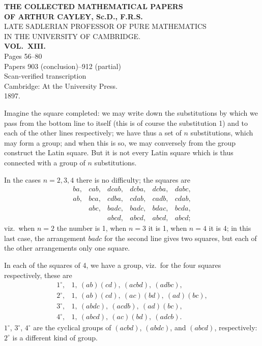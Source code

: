 \documentclass[11pt,a4paper]{article}
\begin{document}
\thispagestyle{empty}
\begin{center}
\vspace*{2cm}
{\LARGE\bfseries THE COLLECTED MATHEMATICAL PAPERS\\[0.5em] OF ARTHUR CAYLEY, Sc.D., F.R.S.\\[1em]}
{\Large LATE SADLERIAN PROFESSOR OF PURE MATHEMATICS\\ IN THE UNIVERSITY OF CAMBRIDGE.\\[2em]}
{\LARGE\bfseries VOL.\ XIII.\\[2em]}
{\large Pages 56--80\\[0.5em] Papers 903 (conclusion)--912 (partial)\\[2em]}
{\large Scan-verified transcription\\[3em]}
\vfill
{\large Cambridge: At the University Press.\\ 1897.\\[1em]}
\end{center}
\clearpage

\setcounter{page}{56}


\noindent Imagine the square completed: we may write down the substitutions by which we pass from the bottom line to itself (this is of course the substitution 1) and to each of the other lines respectively; we have thus a set of $n$ substitutions, which may form a group; and when this is so, we may conversely from the group construct the Latin square. But it is not every Latin square which is thus connected with a group of $n$ substitutions.

In the cases $n = 2, 3, 4$ there is no difficulty; the squares are
\[
\begin{array}{cccccc}
ba, & cab, & dcab, & dcba, & dcba, & dabc,\\
ab, & bca, & cdba, & cdab, & cadb, & cdab,\\
    & abc, & badc, & badc, & bdac, & bcda,\\
    &      & abcd, & abcd, & abcd, & abcd;
\end{array}
\]
viz.\ when $n = 2$ the number is 1, when $n = 3$ it is 1, when $n = 4$ it is 4; in this last case, the arrangement $badc$ for the second line gives two squares, but each of the other arrangements only one square.

In each of the squares of 4, we have a group, viz.\ for the four squares respectively, these are
\[
\begin{array}{rl}
1^{\circ}, & 1,\ (ab)(cd),\ (acbd),\ (adbc),\\
2^{\circ}, & 1,\ (ab)(cd),\ (ac)(bd),\ (ad)(bc),\\
3^{\circ}, & 1,\ (abdc),\ (acdb),\ (ad)(bc),\\
4^{\circ}, & 1,\ (abcd),\ (ac)(bd),\ (adcb).
\end{array}
\]
$1^{\circ}$, $3^{\circ}$, $4^{\circ}$ are the cyclical groups of $(acbd)$, $(abdc)$, and $(abcd)$, respectively: $2^{\circ}$ is a different kind of group.
\end{document}
